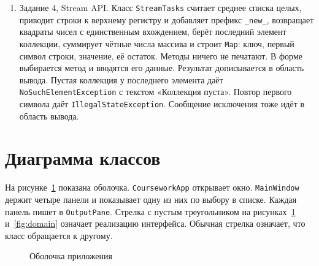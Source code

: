 \documentclass[a4paper,14pt]{extarticle}
\begin{document}
\begin{enumerate}
    \item Задание 4, Stream API. Класс \texttt{StreamTasks} считает среднее списка целых, приводит строки к верхнему регистру и добавляет префикс \texttt{\_new\_}, возвращает квадраты чисел с единственным вхождением, берёт последний элемент коллекции, суммирует чётные числа массива и строит \texttt{Map}: ключ, первый символ строки, значение, её остаток. Методы ничего не печатают. В форме выбирается метод и вводятся его данные. Результат дописывается в область вывода. Пустая коллекция у последнего элемента даёт \texttt{NoSuchElementException} с текстом «Коллекция пуста». Повтор первого символа даёт \texttt{IllegalStateException}. Сообщение исключения тоже идёт в область вывода.

\end{enumerate}

\section*{Диаграмма классов}

На рисунке~\ref{fig:shell} показана оболочка. \texttt{CourseworkApp} открывает окно. \texttt{MainWindow} держит четыре панели и показывает одну из них по выбору в списке. Каждая панель пишет в \texttt{OutputPane}. Стрелка с пустым треугольником на рисунках~\ref{fig:shell} и~\ref{fig:domain} означает реализацию интерфейса. Обычная стрелка означает, что класс обращается к другому.

\begin{figure}[H]
    \centering
    \caption{Оболочка приложения}
    \label{fig:shell}
\end{figure}
\end{document}
